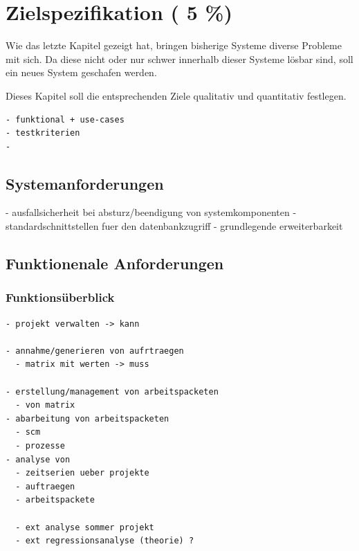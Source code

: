 \chapter{Zielspezifikation ( 5 \%)}

Wie das letzte Kapitel gezeigt hat,
bringen bisherige Systeme diverse Probleme mit sich.
Da diese nicht oder nur schwer innerhalb dieser Systeme l\"osbar sind,
soll ein neues System geschafen werden.

Dieses Kapitel soll die entsprechenden Ziele qualitativ und quantitativ festlegen.







\begin{verbatim}
- funktional + use-cases
- testkriterien
-
\end{verbatim}


\section{Systemanforderungen}



- ausfallsicherheit bei absturz/beendigung
  von systemkomponenten
- standardschnittstellen fuer den datenbankzugriff
- grundlegende erweiterbarkeit

\section{Funktionenale Anforderungen}
\subsection{Funktions\"uberblick}
\begin{verbatim}
- projekt verwalten -> kann

- annahme/generieren von aufrtraegen
  - matrix mit werten -> muss

- erstellung/management von arbeitspacketen
  - von matrix
- abarbeitung von arbeitspacketen
  - scm
  - prozesse
- analyse von
  - zeitserien ueber projekte
  - auftraegen
  - arbeitspackete

  - ext analyse sommer projekt
  - ext regressionsanalyse (theorie) ?
\end{verbatim}

